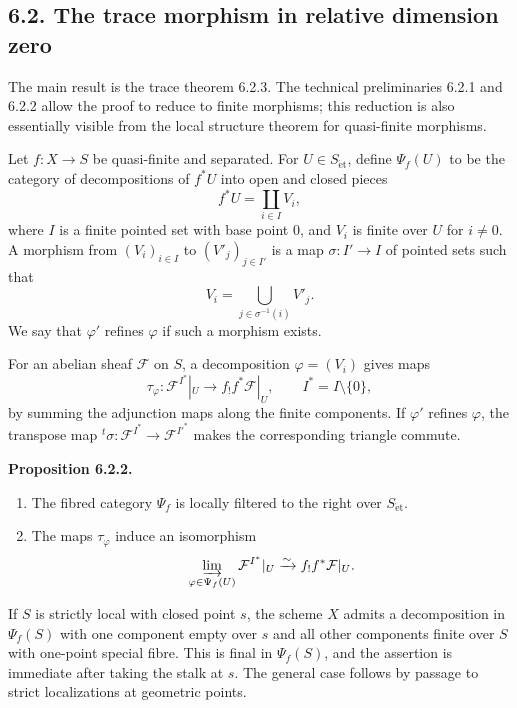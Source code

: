 \documentclass[12pt]{article}
\newcommand{\Ff}{\mathcal F}
\newcommand{\et}{\mathrm{\acute et}}
\newenvironment{statement}[1]{\par\medskip\noindent\textbf{#1.}\ }{\par\medskip}
\begin{document}
\subsection*{6.2. The trace morphism in relative dimension zero}

The main result is the trace theorem 6.2.3. The technical preliminaries 6.2.1 and 6.2.2 allow the proof to reduce to finite morphisms; this reduction is also essentially visible from the local structure theorem for quasi-finite morphisms.

Let \(f:X\to S\) be quasi-finite and separated. For \(U\in S_{\et}\), define \(\Psi_f(U)\) to be the category of decompositions of \(f^*U\) into open and closed pieces
\[
f^*U=\coprod_{i\in I}V_i,
\]
where \(I\) is a finite pointed set with base point \(0\), and \(V_i\) is finite over \(U\) for \(i\ne0\). A morphism from \((V_i)_{i\in I}\) to \((V'_j)_{j\in I'}\) is a map \(\sigma:I'\to I\) of pointed sets such that
\[
V_i=\bigcup_{j\in\sigma^{-1}(i)}V'_j.
\]
We say that \(\varphi'\) refines \(\varphi\) if such a morphism exists.

For an abelian sheaf \(\Ff\) on \(S\), a decomposition \(\varphi=(V_i)\) gives maps
\[
\tau_\varphi:\Ff^{I^*}|_U\longrightarrow f_!f^*\Ff|_U,
\qquad I^*=I\setminus\{0\},
\]
by summing the adjunction maps along the finite components. If \(\varphi'\) refines \(\varphi\), the transpose map \({}^t\sigma:\Ff^{I^*}\to\Ff^{I'^*}\) makes the corresponding triangle commute.

\begin{statement}{Proposition 6.2.2}
\begin{enumerate}[label=(\roman*)]
\item The fibred category \(\Psi_f\) is locally filtered to the right over \(S_{\et}\).
\item The maps \(\tau_\varphi\) induce an isomorphism
\[
\varinjlim_{\varphi\in\Psi_f(U)}\Ff^{I^*}|_U
\xrightarrow{\sim}
f_!f^*\Ff|_U.
\]
\end{enumerate}
\end{statement}

If \(S\) is strictly local with closed point \(s\), the scheme \(X\) admits a decomposition in \(\Psi_f(S)\) with one component empty over \(s\) and all other components finite over \(S\) with one-point special fibre. This is final in \(\Psi_f(S)\), and the assertion is immediate after taking the stalk at \(s\). The general case follows by passage to strict localizations at geometric points.
\end{document}
